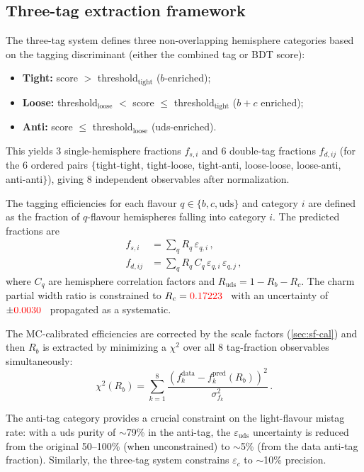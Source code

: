 \documentclass[11pt,a4paper]{article}
\newcommand{\external}[1]{\textcolor{red}{#1}}
\begin{document}
\subsection{Three-tag extraction framework}
\label{sec:three-tag}

The three-tag system defines three non-overlapping hemisphere categories
based on the tagging discriminant (either the combined tag or BDT score):
\begin{itemize}
\item \textbf{Tight:} score $>$ threshold$_\mathrm{tight}$ ($b$-enriched);
\item \textbf{Loose:} threshold$_\mathrm{loose}$ $<$ score
  $\leq$ threshold$_\mathrm{tight}$ ($b + c$ enriched);
\item \textbf{Anti:} score $\leq$ threshold$_\mathrm{loose}$
  (uds-enriched).
\end{itemize}
This yields 3 single-hemisphere fractions $f_{s,i}$ and 6 double-tag
fractions $f_{d,ij}$ (for the 6 ordered pairs $\{$tight-tight,
tight-loose, tight-anti, loose-loose, loose-anti, anti-anti$\}$), giving
8 independent observables after normalization.

The tagging efficiencies for each flavour $q \in \{b, c, \mathrm{uds}\}$
and category $i$ are defined as the fraction of $q$-flavour hemispheres
falling into category $i$.  The predicted fractions are
\begin{align}
  f_{s,i}   &= \sum_q R_q\, \varepsilon_{q,i}\,, \label{eq:fs}\\
  f_{d,ij}  &= \sum_q R_q\, C_q\, \varepsilon_{q,i}\, \varepsilon_{q,j}\,,
  \label{eq:fd}
\end{align}
where $C_q$ are hemisphere correlation factors and $R_\mathrm{uds} =
1 - R_b - R_c$.  The charm partial width ratio is constrained to
$R_c = \external{0.17223}$~\cite{LEP:EWWG:2005} with an uncertainty
of $\pm\external{0.0030}$~\cite{LEP:EWWG:2005} propagated as a
systematic.

The MC-calibrated efficiencies are corrected by the scale factors
(\cref{sec:sf-cal}) and then $R_b$ is extracted by minimizing a
$\chi^2$ over all 8 tag-fraction observables simultaneously:
\begin{equation}
  \chi^2(R_b) = \sum_{k=1}^{8}
    \frac{\left(f_k^\mathrm{data} - f_k^\mathrm{pred}(R_b)\right)^2}
         {\sigma_{f_k}^2}\,.
  \label{eq:chi2-3tag}
\end{equation}

The anti-tag category provides a crucial constraint on the light-flavour
mistag rate: with a uds purity of $\sim$79\% in the anti-tag, the
$\varepsilon_\mathrm{uds}$ uncertainty is reduced from the original
50--100\% (when unconstrained) to $\sim$5\% (from the data anti-tag
fraction).  Similarly, the three-tag system constrains $\varepsilon_c$
to $\sim$10\% precision.
\end{document}
